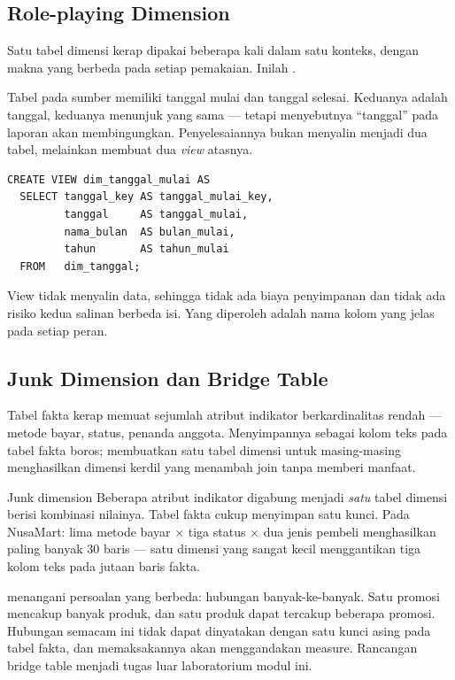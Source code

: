 \subsection{Role-playing Dimension}

Satu tabel dimensi kerap dipakai beberapa kali dalam satu konteks, dengan
makna yang berbeda pada setiap pemakaian. Inilah .

Tabel  pada sumber memiliki tanggal mulai dan tanggal
selesai. Keduanya adalah tanggal, keduanya menunjuk 
yang sama --- tetapi menyebutnya ``tanggal'' pada laporan akan
membingungkan. Penyelesaiannya bukan menyalin  menjadi
dua tabel, melainkan membuat dua \emph{view} atasnya.

\begin{lstlisting}[style=sqlgaya]
CREATE VIEW dim_tanggal_mulai AS
  SELECT tanggal_key AS tanggal_mulai_key,
         tanggal     AS tanggal_mulai,
         nama_bulan  AS bulan_mulai,
         tahun       AS tahun_mulai
  FROM   dim_tanggal;
\end{lstlisting}

View tidak menyalin data, sehingga tidak ada biaya penyimpanan dan tidak ada
risiko kedua salinan berbeda isi. Yang diperoleh adalah nama kolom yang jelas
pada setiap peran.

\subsection{Junk Dimension dan Bridge Table}

Tabel fakta kerap memuat sejumlah atribut indikator berkardinalitas rendah ---
metode bayar, status, penanda anggota. Menyimpannya sebagai kolom teks pada
tabel fakta boros; membuatkan satu tabel dimensi untuk masing-masing
menghasilkan dimensi kerdil yang menambah join tanpa memberi manfaat.

\begin{konsep}{Junk dimension}
Beberapa atribut indikator digabung menjadi \emph{satu} tabel dimensi berisi
kombinasi nilainya. Tabel fakta cukup menyimpan satu kunci. Pada NusaMart:
lima metode bayar $\times$ tiga status $\times$ dua jenis pembeli menghasilkan
paling banyak 30 baris --- satu dimensi yang sangat kecil menggantikan tiga
kolom teks pada jutaan baris fakta.
\end{konsep}

 menangani persoalan yang berbeda: hubungan
banyak-ke-banyak. Satu promosi mencakup banyak produk, dan satu produk dapat
tercakup beberapa promosi. Hubungan semacam ini tidak dapat dinyatakan dengan
satu kunci asing pada tabel fakta, dan memaksakannya akan menggandakan measure.
Rancangan bridge table menjadi tugas luar laboratorium modul ini.

